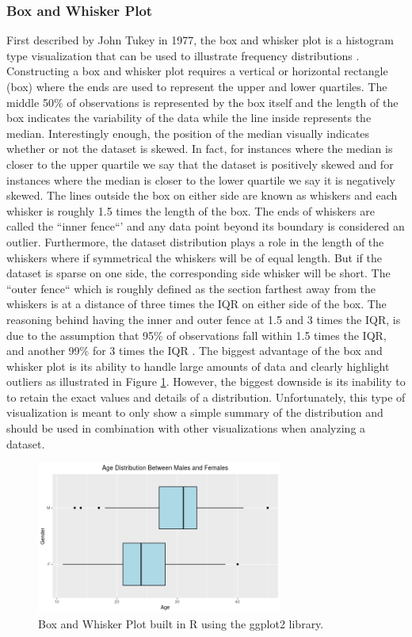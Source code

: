 \subsubsection{Box and Whisker Plot}
First described by John Tukey in 1977, the box and whisker plot is a histogram
type visualization that can be used to illustrate frequency distributions \cite{c10}. Constructing
a box and whisker plot requires a vertical or horizontal rectangle (box) where the 
ends are used to represent the upper and lower quartiles. The middle 50\% of observations 
is represented by the box itself and the length of the box indicates the variability 
of the data while the line inside represents the median. Interestingly enough, 
the position of the median visually indicates whether or not the dataset is skewed. 
In fact, for instances where the median is closer to the upper quartile we say that 
the dataset is positively skewed and for instances where the median is closer to 
the lower quartile we say it is negatively skewed. 
The lines outside the box on either side are known as whiskers and each whisker 
is roughly 1.5 times the length of the box. The ends of whiskers are called the 
``inner fence``' and any data point beyond its boundary is considered an outlier. 
Furthermore, the dataset distribution plays a role in the length of the whiskers 
where if symmetrical the whiskers will be of equal length. But if the dataset 
is sparse on one side, the corresponding side whisker will be short. The ``outer fence``
which is roughly defined as the section farthest away from the whiskers is at a 
distance of three times the IQR on either side of the box. The reasoning behind 
having the inner and outer fence at 1.5 and 3 times the IQR, is due to the assumption 
that 95\% of observations fall within 1.5 times the IQR, and another 99\% for 3 
times the IQR \cite{c10}. The biggest advantage of the box and whisker plot is its ability 
to handle large amounts of data and clearly highlight outliers as illustrated in 
Figure \ref{figure:box_and_whisker}. However, the biggest downside is its inability to
to retain the exact values and details of a distribution. Unfortunately, this type
of visualization is meant to only show a simple summary of the distribution and
should be used in combination with other visualizations when analyzing a dataset.

\begin{figure}[!ht]
    \centering
        \includegraphics[height=5cm]{figures/box_and_whisker.png}
    \caption{Box and Whisker Plot built in R using the ggplot2 library.}
    \label{figure:box_and_whisker}
\end{figure} 

